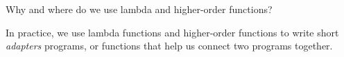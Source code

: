 \begin{blocksection}
\question Why and where do we use lambda and higher-order functions?

\begin{solution}[0.5in]
In practice, we use lambda functions and higher-order functions to write short \emph{adapters} programs, or functions that help us connect two programs together.
\end{solution}
\end{blocksection}
